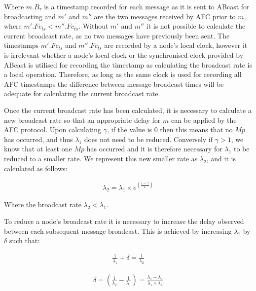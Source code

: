     Where $m.B_\tau$ is a timestamp recorded for each message as it is sent to \textsf{ABcast} for broadcasting and $m'$ and $m''$ are the two messages received by AFC prior to $m$, where $m'.Fc_{ts} < m''.Fc_{ts}$.  Without $m'$ and $m''$ it is not possible to calculate the current broadcast rate, as no two messages have previously been sent.  The timestamps $m'.Fc_{ts}$ and $m''.Fc_{ts}$ are recorded by a node's local clock, however it is irrelevant whether a node's local clock or the  synchronised clock provided by \textsf{ABcast} is utilised for recording the timestamp as calculating the broadcast rate is a local operation.  Therefore, as long as the same clock is used for recording all AFC timestamps the difference between message broadcast times will be adequate for calculating the current broadcast rate.   
    
    Once the current broadcast rate has been calculated, it is necessary to calculate a new broadcast rate so that an appropriate delay for $m$ can be applied by the AFC protocol.  Upon calculating $\gamma$, if the value is $0$ then this means that no $Mp$ has occurred, and thus $\lambda_1$ does not need to be reduced.  Conversely if $\gamma > 1$, we know that at least one $Mp$ has occurred and it is therefore necessary for $\lambda_1$ to be reduced to a smaller rate.  We represent this new smaller rate as $\lambda_2$, and it is calculated as follows:
    
      \begin{equation*}
		     \begin{aligned}
		         \lambda_2 = \lambda_1 \times e ^{ ({\frac{1-\gamma}{C}})}
		     \end{aligned}
    \end{equation*} 
    
    Where the broadcast rate $\lambda_2 < \lambda_1$.  
    
    To reduce a node's broadcast rate it is necessary to increase the delay observed between each subsequent message broadcast.  This is achieved by increasing $\lambda_1$ by $\delta$ such that:
    
    \begin{equation}
		     \begin{aligned}
		         \frac{1}{\lambda_1} + \delta = \frac{1}{\lambda_2}
		     \end{aligned}
    \end{equation} 
    
    \begin{equation}
		     \begin{aligned}
		         \delta = (\frac{1}{\lambda_2} - \frac{1}{\lambda_1}) = \frac{\lambda_1 - \lambda_2}{\lambda_1 \times \lambda_2}
		     \end{aligned}
    \end{equation} 
        
